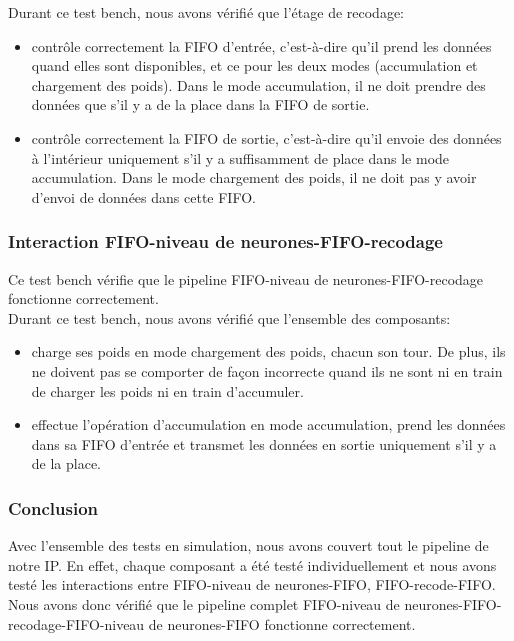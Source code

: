 Durant ce test bench, nous avons vérifié que l'étage de recodage:
\begin{itemize}
	\item contrôle correctement la FIFO d'entrée, c'est-à-dire qu'il prend
	les données quand elles sont disponibles, et ce pour les deux modes
	(accumulation et chargement des poids). Dans le mode accumulation, il
	ne doit prendre des données que s'il y a de la place dans la FIFO de
	sortie.
	\item contrôle correctement la FIFO de sortie, c'est-à-dire qu'il envoie
	des données à l'intérieur uniquement s'il y a suffisamment de place dans
	le mode accumulation. Dans le mode chargement des poids, il ne doit pas
	y avoir d'envoi de données dans cette FIFO.
\end{itemize}

\subsubsection{Interaction FIFO-niveau de neurones-FIFO-recodage}

Ce test bench vérifie que le pipeline FIFO-niveau de neurones-FIFO-recodage
fonctionne correctement.\\

Durant ce test bench, nous avons vérifié que l'ensemble des composants:
\begin{itemize}
	\item charge ses poids en mode chargement des poids, chacun son tour.
	De plus, ils ne doivent pas se comporter de façon incorrecte quand
	ils ne sont ni en train de charger les poids ni en train d'accumuler.
	\item effectue l'opération d'accumulation en mode accumulation, prend
	les données dans sa FIFO d'entrée et transmet les données en sortie
	uniquement s'il y a de la place.
\end{itemize}

\subsubsection{Conclusion}

Avec l'ensemble des tests en simulation, nous avons couvert tout le pipeline de
notre IP. En effet, chaque composant a été testé individuellement et nous avons
testé les interactions entre FIFO-niveau de neurones-FIFO, FIFO-recode-FIFO.
Nous avons donc vérifié que le pipeline complet
FIFO-niveau de neurones-FIFO-recodage-FIFO-niveau de neurones-FIFO fonctionne
correctement.

